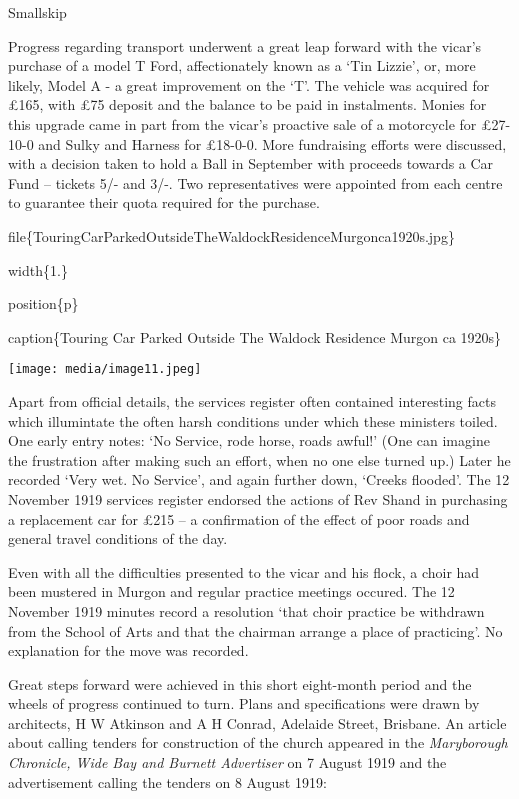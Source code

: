 Smallskip

Progress regarding transport underwent a great leap forward with the vicar's purchase of a model T Ford, affectionately known as a `Tin Lizzie', or, more likely, Model A - a great improvement on the `T'. The vehicle was acquired for £165, with £75 deposit and the balance to be paid in instalments. Monies for this upgrade came in part from the vicar's proactive sale of a motorcycle for £27-10-0 and Sulky and Harness for £18-0-0. More fundraising efforts were discussed, with a decision taken to hold a Ball in September with proceeds towards a Car Fund -- tickets 5/- and 3/-. Two representatives were appointed from each centre to guarantee their quota required for the purchase.

file\{TouringCarParkedOutsideTheWaldockResidenceMurgonca1920s.jpg\}

width\{1.\}

position\{p\}

caption\{Touring Car Parked Outside The Waldock Residence Murgon ca 1920s\}

\texttt{[image: media/image11.jpeg]}

Apart from official details, the services register often contained interesting facts which illumintate the often harsh conditions under which these ministers toiled. One early entry notes: `No Service, rode horse, roads awful!' (One can imagine the frustration after making such an effort, when no one else turned up.) Later he recorded `Very wet. No Service', and again further down, `Creeks flooded'. The 12 November 1919 services register endorsed the actions of Rev Shand in purchasing a replacement car for £215 -- a confirmation of the effect of poor roads and general travel conditions of the day.

Even with all the difficulties presented to the vicar and his flock, a choir had been mustered in Murgon and regular practice meetings occured. The 12 November 1919 minutes record a resolution `that choir practice be withdrawn from the School of Arts and that the chairman arrange a place of practicing'. No explanation for the move was recorded.

Great steps forward were achieved in this short eight-month period and the wheels of progress continued to turn. Plans and specifications were drawn by architects, H W Atkinson and A H Conrad, Adelaide Street, Brisbane. An article about calling tenders for construction of the church appeared in the \emph{Maryborough Chronicle, Wide Bay and Burnett Advertiser} on 7 August 1919 and the advertisement calling the tenders on 8 August 1919:

